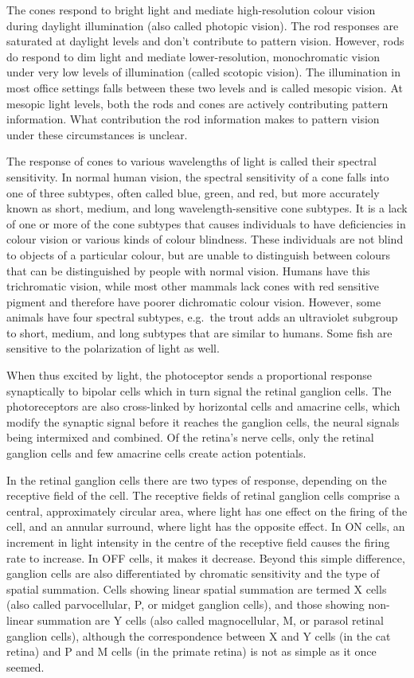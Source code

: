 The cones respond to bright light and mediate high-resolution colour vision during daylight illumination (also called photopic vision). The rod responses are saturated at daylight levels and don't contribute to pattern vision. However, rods do respond to dim light and mediate lower-resolution, monochromatic vision under very low levels of illumination (called scotopic vision). The illumination in most office settings falls between these two levels and is called mesopic vision. At mesopic light levels, both the rods and cones are actively contributing pattern information. What contribution the rod information makes to pattern vision under these circumstances is unclear.

The response of cones to various wavelengths of light is called their spectral sensitivity. In normal human vision, the spectral sensitivity of a cone falls into one of three subtypes, often called blue, green, and red, but more accurately known as short, medium, and long wavelength-sensitive cone subtypes. It is a lack of one or more of the cone subtypes that causes individuals to have deficiencies in colour vision or various kinds of colour blindness. These individuals are not blind to objects of a particular colour, but are unable to distinguish between colours that can be distinguished by people with normal vision. Humans have this trichromatic vision, while most other mammals lack cones with red sensitive pigment and therefore have poorer dichromatic colour vision. However, some animals have four spectral subtypes, e.g.~the trout adds an ultraviolet subgroup to short, medium, and long subtypes that are similar to humans. Some fish are sensitive to the polarization of light as well.

When thus excited by light, the photoceptor sends a proportional response synaptically to bipolar cells which in turn signal the retinal ganglion cells. The photoreceptors are also cross-linked by horizontal cells and amacrine cells, which modify the synaptic signal before it reaches the ganglion cells, the neural signals being intermixed and combined. Of the retina's nerve cells, only the retinal ganglion cells and few amacrine cells create action potentials.

In the retinal ganglion cells there are two types of response, depending on the receptive field of the cell. The receptive fields of retinal ganglion cells comprise a central, approximately circular area, where light has one effect on the firing of the cell, and an annular surround, where light has the opposite effect. In ON cells, an increment in light intensity in the centre of the receptive field causes the firing rate to increase. In OFF cells, it makes it decrease. Beyond this simple difference, ganglion cells are also differentiated by chromatic sensitivity and the type of spatial summation. Cells showing linear spatial summation are termed X cells (also called parvocellular, P, or midget ganglion cells), and those showing non-linear summation are Y cells (also called magnocellular, M, or parasol retinal ganglion cells), although the correspondence between X and Y cells (in the cat retina) and P and M cells (in the primate retina) is not as simple as it once seemed.

